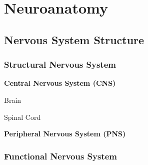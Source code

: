 \section{Neuroanatomy}

\subsection{Nervous System Structure}

\subsubsection{Structural Nervous System}


\begin{coloredlist}
    \item \textbf{Central Nervous System (CNS)}
    \begin{coloredlist}
        \item Brain
        \item Spinal Cord
    \end{coloredlist}
    \item \textbf{Peripheral Nervous System (PNS)}

\end{coloredlist}

\subsubsection{Functional Nervous System}


